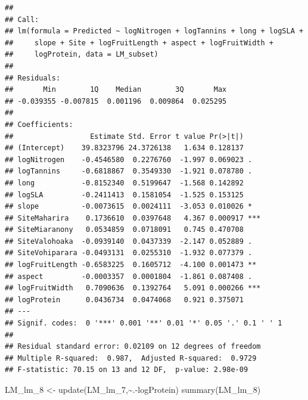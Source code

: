 \documentclass[
  12pt,
]{article}
\newenvironment{Shaded}{\begin{snugshade}}{\end{snugshade}}
\newcommand{\FunctionTok}[1]{\textcolor[rgb]{0.00,0.00,0.00}{#1}}
\newcommand{\NormalTok}[1]{#1}
\newcommand{\OtherTok}[1]{\textcolor[rgb]{0.56,0.35,0.01}{#1}}
\newcommand{\SpecialCharTok}[1]{\textcolor[rgb]{0.00,0.00,0.00}{#1}}
\begin{document}
\begin{verbatim}
## 
## Call:
## lm(formula = Predicted ~ logNitrogen + logTannins + long + logSLA + 
##     slope + Site + logFruitLength + aspect + logFruitWidth + 
##     logProtein, data = LM_subset)
## 
## Residuals:
##       Min        1Q    Median        3Q       Max 
## -0.039355 -0.007815  0.001196  0.009864  0.025295 
## 
## Coefficients:
##                  Estimate Std. Error t value Pr(>|t|)    
## (Intercept)    39.8323796 24.3726138   1.634 0.128137    
## logNitrogen    -0.4546580  0.2276760  -1.997 0.069023 .  
## logTannins     -0.6818867  0.3549330  -1.921 0.078780 .  
## long           -0.8152340  0.5199647  -1.568 0.142892    
## logSLA         -0.2411413  0.1581054  -1.525 0.153125    
## slope          -0.0073615  0.0024111  -3.053 0.010026 *  
## SiteMaharira    0.1736610  0.0397648   4.367 0.000917 ***
## SiteMiaranony   0.0534859  0.0718091   0.745 0.470708    
## SiteValohoaka  -0.0939140  0.0437339  -2.147 0.052889 .  
## SiteVohiparara -0.0493131  0.0255310  -1.932 0.077379 .  
## logFruitLength -0.6583225  0.1605712  -4.100 0.001473 ** 
## aspect         -0.0003357  0.0001804  -1.861 0.087408 .  
## logFruitWidth   0.7090636  0.1392764   5.091 0.000266 ***
## logProtein      0.0436734  0.0474068   0.921 0.375071    
## ---
## Signif. codes:  0 '***' 0.001 '**' 0.01 '*' 0.05 '.' 0.1 ' ' 1
## 
## Residual standard error: 0.02109 on 12 degrees of freedom
## Multiple R-squared:  0.987,  Adjusted R-squared:  0.9729 
## F-statistic: 70.15 on 13 and 12 DF,  p-value: 2.98e-09
\end{verbatim}

\begin{Shaded}
\begin{Highlighting}[]
\NormalTok{LM\_lm\_8 }\OtherTok{\textless{}{-}} \FunctionTok{update}\NormalTok{(LM\_lm\_7,}\SpecialCharTok{\textasciitilde{}}\NormalTok{.}\SpecialCharTok{{-}}\NormalTok{logProtein)}
\FunctionTok{summary}\NormalTok{(LM\_lm\_8)}
\end{Highlighting}
\end{Shaded}
\end{document}

